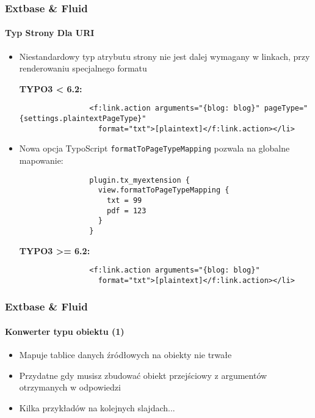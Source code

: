
\begin{frame}[fragile]
	\frametitle{Extbase \& Fluid}
	\framesubtitle{Typ Strony Dla URI}

	\lstset{
		basicstyle=\tiny\ttfamily
	}

	\begin{itemize}
		\item Niestandardowy typ atrybutu strony nie jest dalej wymagany w linkach, przy renderowaniu specjalnego formatu

			\smaller\textbf{TYPO3 < 6.2:}\normalsize
			\begin{lstlisting}
				<f:link.action arguments="{blog: blog}" pageType="{settings.plaintextPageType}"
				  format="txt">[plaintext]</f:link.action></li>
			\end{lstlisting}

		\item Nowa opcja TypoScript \texttt{formatToPageTypeMapping} pozwala na globalne mapowanie:

			\begin{lstlisting}
				plugin.tx_myextension {
				  view.formatToPageTypeMapping {
				    txt = 99
				    pdf = 123
				  }
				}
			\end{lstlisting}

			\smaller\textbf{TYPO3 >= 6.2:}\normalsize
			\begin{lstlisting}
				<f:link.action arguments="{blog: blog}"
				  format="txt">[plaintext]</f:link.action></li>
			\end{lstlisting}

	\end{itemize}

\end{frame}


\begin{frame}[fragile]
	\frametitle{Extbase \& Fluid}
	\framesubtitle{Konwerter typu obiektu (1)}

	\begin{itemize}
		\item Mapuje tablice danych źródłowych na obiekty nie trwałe
		\item Przydatne gdy musisz zbudować obiekt przejściowy z argumentów otrzymanych w odpowiedzi
		\item Kilka przykładów na kolejnych slajdach...

	\end{itemize}

\end{frame}

